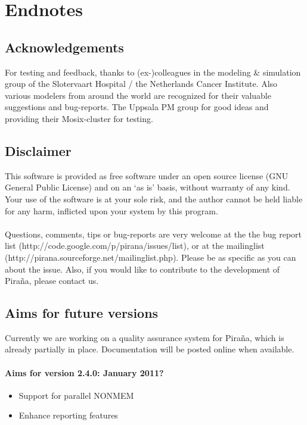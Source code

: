 \documentclass[a4,11pt]{report} \usepackage[pdftex]{graphicx}
\begin{document}
{{{{\chapter{Endnotes}
\section{Acknowledgements} For testing and feedback, thanks to
(ex-)colleagues in the modeling \& simulation group of the Slotervaart
Hospital / the Netherlands Cancer Institute. Also various modelers
from around the world are recognized for their valuable suggestions
and bug-reports. The Uppsala PM group for good ideas and
providing their Mosix-cluster for testing.

\section{Disclaimer} This software is provided as free software under
an open source license (GNU General Public License) and on an `as is'
basis, without warranty of any kind. Your use of the software is at
your sole risk, and the author cannot be held liable for any harm,
inflicted upon your system by this program.\\ \vspace{5pt} \\
Questions, comments, tips or bug-reports are very welcome at the the
bug report list (http://code.google.com/p/pirana/issues/list), or at
the mailinglist
(http://pirana.sourceforge.net/mailinglist.php). Please be as specific
as you can about the issue. Also, if you would like to contribute to
the development of Pira\~na, please contact us.

\section{Aims for future versions}
Currently we are working on a quality assurance system for Pira\~na,
which is already partially in place. Documentation will be posted
online when available.

\subsubsection*{Aims for version 2.4.0: January 2011?}
\begin{itemize} \scriptsize
  \item Support for parallel NONMEM
  \item Enhance reporting features
\end{itemize}

}}}}
\end{document}
